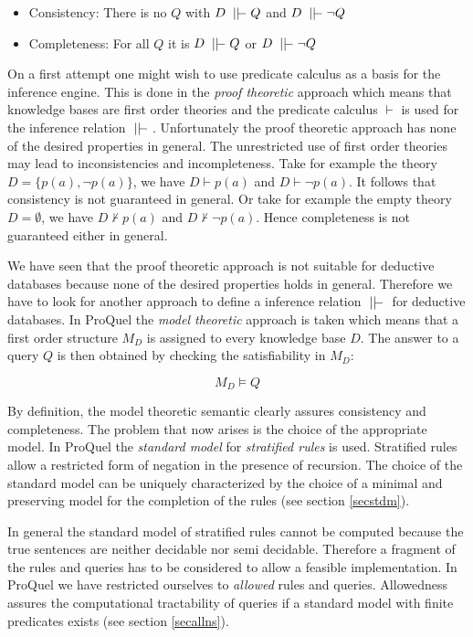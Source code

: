 \begin{itemize}
\item Consistency: There is no $Q$ with $D \;\mid\mid\!\!\!-\; Q$ and $D \;\mid\mid\!\!\!-\; \neg Q$
\item Completeness: For all $Q$ it is $D \;\mid\mid\!\!\!-\; Q$ or $D \;\mid\mid\!\!\!-\; \neg Q$
\end{itemize}

On a first attempt one might wish to use predicate calculus as a basis for the inference engine.
This is done in the {\em proof theoretic} approach which means that knowledge bases are first
order theories and the predicate calculus $\vdash$ is used for the inference relation $\;\mid\mid\!\!\!-\;$. 
Unfortunately the proof theoretic approach has none of the desired properties in general. 
The unrestricted use of first order theories may lead to inconsistencies and incompleteness. Take 
for example the theory $D=\{p(a),\neg p(a)\}$, we have $D \vdash p(a)$ and $D \vdash \neg p(a)$. 
It follows that consistency is not guaranteed in general. Or take for example the empty theory 
$D=\emptyset$, we have $D \not\vdash p(a)$ and $D \not\vdash \neg p(a)$. Hence completeness is 
not guaranteed either in general. 

We have seen that the proof theoretic approach is not suitable for deductive databases because 
none of the desired properties holds in general. Therefore we have to look for another approach
to define a inference relation $\;\mid\mid\!\!\!-\;$ for deductive databases. In ProQuel the {\em model theoretic} 
approach is taken which means that a first order structure $M_D$ is assigned to every knowledge 
base $D$. The answer to a query $Q$ is then obtained by checking the satisfiability in $M_D$:

\begin{displaymath}
M_D \models Q
\end{displaymath}

By definition, the model theoretic semantic clearly assures consistency and completeness. 
The problem that now arises is the choice of the appropriate model. In ProQuel the {\em standard 
model} for {\em stratified rules} is used. Stratified rules allow a restricted form of 
negation in the presence of recursion. The choice of the standard model can be uniquely
characterized  by the choice of a minimal and preserving model for the completion of the 
rules (see section \ref{secstdm}).

In general the standard model of stratified rules cannot be computed because the true sentences
are neither decidable nor semi decidable. Therefore a fragment of the rules and queries has to 
be considered to allow a feasible implementation. In ProQuel we have restricted ourselves to 
{\em allowed} rules and queries. Allowedness assures the computational tractability of queries 
if a standard model with finite predicates exists (see section \ref{secallns}).


